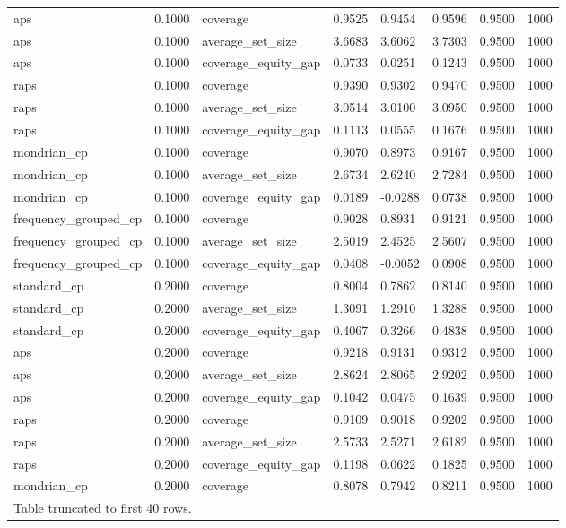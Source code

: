 \begin{table}[htbp]
\begin{tabular}{llllllll}
aps & 0.1000 & coverage & 0.9525 & 0.9454 & 0.9596 & 0.9500 & 1000 \\
aps & 0.1000 & average\_set\_size & 3.6683 & 3.6062 & 3.7303 & 0.9500 & 1000 \\
aps & 0.1000 & coverage\_equity\_gap & 0.0733 & 0.0251 & 0.1243 & 0.9500 & 1000 \\
raps & 0.1000 & coverage & 0.9390 & 0.9302 & 0.9470 & 0.9500 & 1000 \\
raps & 0.1000 & average\_set\_size & 3.0514 & 3.0100 & 3.0950 & 0.9500 & 1000 \\
raps & 0.1000 & coverage\_equity\_gap & 0.1113 & 0.0555 & 0.1676 & 0.9500 & 1000 \\
mondrian\_cp & 0.1000 & coverage & 0.9070 & 0.8973 & 0.9167 & 0.9500 & 1000 \\
mondrian\_cp & 0.1000 & average\_set\_size & 2.6734 & 2.6240 & 2.7284 & 0.9500 & 1000 \\
mondrian\_cp & 0.1000 & coverage\_equity\_gap & 0.0189 & -0.0288 & 0.0738 & 0.9500 & 1000 \\
frequency\_grouped\_cp & 0.1000 & coverage & 0.9028 & 0.8931 & 0.9121 & 0.9500 & 1000 \\
frequency\_grouped\_cp & 0.1000 & average\_set\_size & 2.5019 & 2.4525 & 2.5607 & 0.9500 & 1000 \\
frequency\_grouped\_cp & 0.1000 & coverage\_equity\_gap & 0.0408 & -0.0052 & 0.0908 & 0.9500 & 1000 \\
standard\_cp & 0.2000 & coverage & 0.8004 & 0.7862 & 0.8140 & 0.9500 & 1000 \\
standard\_cp & 0.2000 & average\_set\_size & 1.3091 & 1.2910 & 1.3288 & 0.9500 & 1000 \\
standard\_cp & 0.2000 & coverage\_equity\_gap & 0.4067 & 0.3266 & 0.4838 & 0.9500 & 1000 \\
aps & 0.2000 & coverage & 0.9218 & 0.9131 & 0.9312 & 0.9500 & 1000 \\
aps & 0.2000 & average\_set\_size & 2.8624 & 2.8065 & 2.9202 & 0.9500 & 1000 \\
aps & 0.2000 & coverage\_equity\_gap & 0.1042 & 0.0475 & 0.1639 & 0.9500 & 1000 \\
raps & 0.2000 & coverage & 0.9109 & 0.9018 & 0.9202 & 0.9500 & 1000 \\
raps & 0.2000 & average\_set\_size & 2.5733 & 2.5271 & 2.6182 & 0.9500 & 1000 \\
raps & 0.2000 & coverage\_equity\_gap & 0.1198 & 0.0622 & 0.1825 & 0.9500 & 1000 \\
mondrian\_cp & 0.2000 & coverage & 0.8078 & 0.7942 & 0.8211 & 0.9500 & 1000 \\
\multicolumn{8}{l}{Table truncated to first 40 rows.} \\
\hline
\end{tabular}
\end{table}
